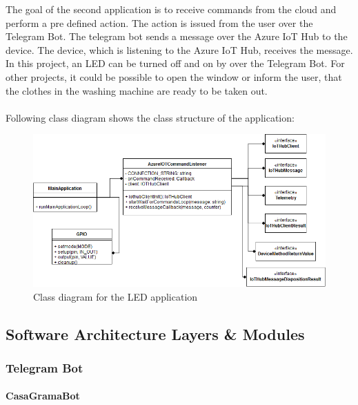 \documentclass[a4paper]{article}
\begin{document}
			The goal of the second application is to receive commands from the cloud and perform a pre defined action.
			The action is issued from the user over the Telegram Bot.
			The telegram bot sends a message over the Azure IoT Hub to the device.
			The device, which is listening to the Azure IoT Hub, receives the message.
			In this project, an LED can be turned off and on by over the Telegram Bot.
			For other projects, it could be possible to open the window or inform the user, that the clothes in the washing machine are ready to be taken out.
			\\
			\\
			Following class diagram shows the class structure of the application:
			\begin{figure}[!htb]
				\centering
				\includegraphics[width=\textwidth]{img/raspberry_led_application.png}
				\caption{Class diagram for the LED application}
				\label{fig:raspiledclass}
			\end{figure}
			
		
		\newpage
		\subsection{Software Architecture Layers \& Modules}
		
			\subsubsection{Telegram Bot}
					
				\paragraph{CasaGramaBot}
							
\end{document}
